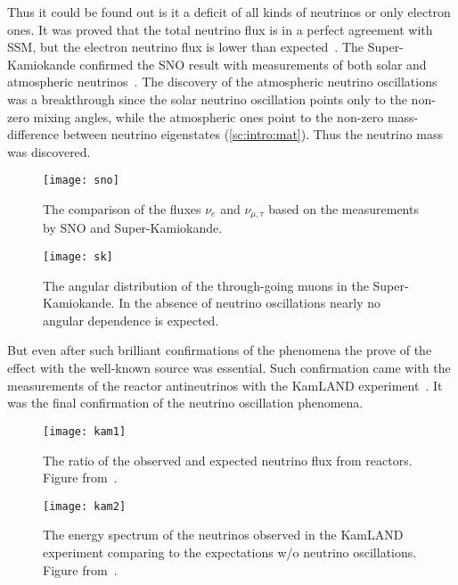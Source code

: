 \documentclass[../main.tex]{subfiles}
\begin{document}
Thus it could be found out is it a deficit of all kinds of neutrinos or only electron ones. It was proved that the total neutrino flux is in a perfect agreement with SSM, but the electron neutrino flux is lower than expected~\cite{Ahmad2002}. The Super-Kamiokande confirmed the SNO result with measurements of both solar and atmospheric neutrinos~\cite{Fukuda1999}. The discovery of the atmospheric neutrino oscillations was a breakthrough since the solar neutrino oscillation points only to the non-zero mixing angles, while the atmospheric ones point to the non-zero mass-difference between neutrino eigenstates (\autoref{sc:intro:mat}). Thus the neutrino mass was discovered.

\begin{figure}
  \centering
  \begin{minipage}{0.49\linewidth}
  \centering
    \texttt{[image: sno]}
    \caption{The comparison of the fluxes $\nu_e$ and $\nu_{\mu,\tau}$ based on the measurements by SNO and Super-Kamiokande.}
    \label{fig:intro:sno}
  \end{minipage}
  \begin{minipage}{0.49\linewidth}
  \centering
    \texttt{[image: sk]}
    \caption{The angular distribution of the through-going muons in the Super-Kamiokande. In the absence of neutrino oscillations nearly no angular dependence is expected.}
    \label{fig:intro:sk}
  \end{minipage}
\end{figure}

But even after such brilliant confirmations of the phenomena the prove of the effect with the well-known source was essential. Such confirmation came with the measurements of the reactor antineutrinos with the KamLAND experiment~\cite{Eguchi2003}. It was the final confirmation of the neutrino oscillation phenomena.

\begin{figure}
  \centering
  \begin{minipage}{0.45\linewidth}
  \centering
    \texttt{[image: kam1]}
    \caption{The ratio of the observed and expected neutrino flux from reactors. Figure from~\cite{Eguchi2003}.}
    \label{fig:intro:kam1}
  \end{minipage}
  \begin{minipage}{0.45\linewidth}
  \centering
    \texttt{[image: kam2]}
    \caption{The energy spectrum of the neutrinos observed in the KamLAND experiment comparing to the expectations w/o neutrino oscillations. Figure from~\cite{Eguchi2003}.}
    \label{fig:intro:kam2}
  \end{minipage}
\end{figure}
\end{document}
